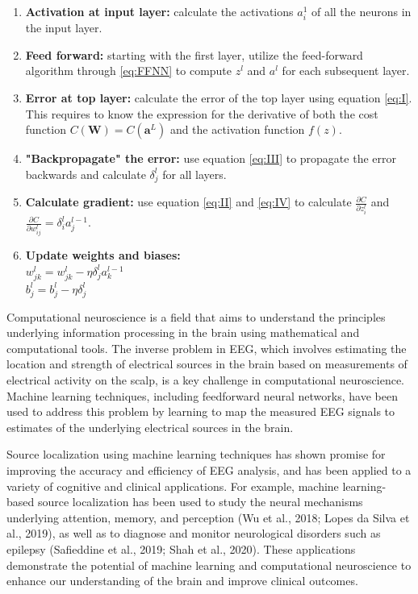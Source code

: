 \documentclass[a4paper, UKenglish, 11pt]{uiomaster}
\begin{document}
\begin{enumerate}
  \item \textbf{Activation at input layer:} calculate the activations $a_i^1$ of all the neurons in the input layer.
  \item \textbf{Feed forward:} starting with the first layer, utilize the feed-forward algorithm through \ref{eq:FFNN} to compute $z^{l}$ and $a^{l}$ for each subsequent layer.
  \item \textbf{Error at top layer:} calculate the error of the top layer using equation \ref{eq:I}. This requires to know the expression for the derivative of both the cost function $C(\boldsymbol{W}) = C(\boldsymbol{a}^L)$ and the activation function $f(z)$.
  \item \textbf{"Backpropagate" the error:} use equation \ref{eq:III} to propagate the error backwards and calculate $\delta_j^l$ for all layers.
  \item \textbf{Calculate gradient:} use equation \ref{eq:II} and \ref{eq:IV} to calculate $\frac{\partial C}{\partial z^l_{i}}$ and $\frac{\partial C}{\partial w^l_{ij}} = \delta_i^l a_j^{l-1}$. \newline
  \item \textbf{Update weights and biases:} \\[2pt] $w^l_{jk}=w^l_{jk}-\eta\delta^l_ja^{l-1}_k$ \\[2pt] $b_j^l = b_j^l - \eta \delta_j^l$
\end{enumerate}










Computational neuroscience is a field that aims to understand the principles underlying information processing in the brain using mathematical and computational tools. The inverse problem in EEG, which involves estimating the location and strength of electrical sources in the brain based on measurements of electrical activity on the scalp, is a key challenge in computational neuroscience. Machine learning techniques, including feedforward neural networks, have been used to address this problem by learning to map the measured EEG signals to estimates of the underlying electrical sources in the brain.

Source localization using machine learning techniques has shown promise for improving the accuracy and efficiency of EEG analysis, and has been applied to a variety of cognitive and clinical applications. For example, machine learning-based source localization has been used to study the neural mechanisms underlying attention, memory, and perception (Wu et al., 2018; Lopes da Silva et al., 2019), as well as to diagnose and monitor neurological disorders such as epilepsy (Safieddine et al., 2019; Shah et al., 2020). These applications demonstrate the potential of machine learning and computational neuroscience to enhance our understanding of the brain and improve clinical outcomes.
\end{document}
